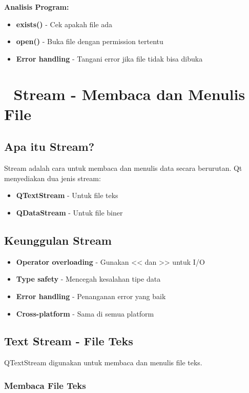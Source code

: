 \textbf{Analisis Program:}
\begin{itemize}
\item \textbf{exists()} - Cek apakah file ada
\item \textbf{open()} - Buka file dengan permission tertentu
\item \textbf{Error handling} - Tangani error jika file tidak bisa dibuka
\end{itemize}

\section{🌊 Stream - Membaca dan Menulis File}

\subsection{Apa itu Stream?}

Stream adalah cara untuk membaca dan menulis data secara berurutan. Qt menyediakan dua jenis stream:

\begin{itemize}
\item \textbf{QTextStream} - Untuk file teks
\item \textbf{QDataStream} - Untuk file biner
\end{itemize}

\subsection{Keunggulan Stream}

\begin{itemize}
\item \textbf{Operator overloading} - Gunakan << dan >> untuk I/O
\item \textbf{Type safety} - Mencegah kesalahan tipe data
\item \textbf{Error handling} - Penanganan error yang baik
\item \textbf{Cross-platform} - Sama di semua platform
\end{itemize}

\subsection{Text Stream - File Teks}

QTextStream digunakan untuk membaca dan menulis file teks.

\subsubsection{Membaca File Teks}

